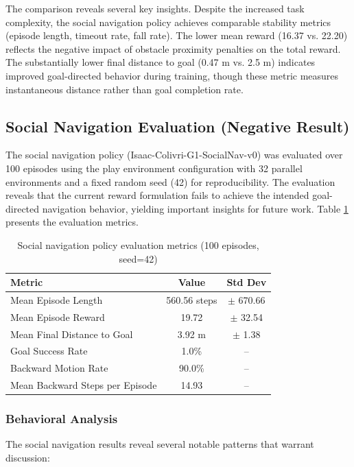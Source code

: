 \documentclass[12pt,a4paper]{article}
\begin{document}
The comparison reveals several key insights. Despite the increased task complexity, the social navigation policy achieves comparable stability metrics (episode length, timeout rate, fall rate). The lower mean reward (16.37 vs. 22.20) reflects the negative impact of obstacle proximity penalties on the total reward. The substantially lower final distance to goal (0.47 m vs. 2.5 m) indicates improved goal-directed behavior during training, though these metric measures instantaneous distance rather than goal completion rate.

\subsection{Social Navigation Evaluation (Negative Result)}

The social navigation policy (Isaac-Colivri-G1-SocialNav-v0) was evaluated over 100 episodes using the play environment configuration with 32 parallel environments and a fixed random seed (42) for reproducibility. The evaluation reveals that the current reward formulation fails to achieve the intended goal-directed navigation behavior, yielding important insights for future work. Table \ref{tab:social_nav_eval} presents the evaluation metrics.

\begin{table}[htbp]
\centering
\caption{Social navigation policy evaluation metrics (100 episodes, seed=42)}
\label{tab:social_nav_eval}
\begin{tabular}{lcc}
\toprule
\textbf{Metric} & \textbf{Value} & \textbf{Std Dev} \\
\midrule
Mean Episode Length & 560.56 steps & $\pm$ 670.66 \\
Mean Episode Reward & 19.72 & $\pm$ 32.54 \\
Mean Final Distance to Goal & 3.92 m & $\pm$ 1.38 \\
Goal Success Rate & 1.0\% & -- \\
Backward Motion Rate & 90.0\% & -- \\
Mean Backward Steps per Episode & 14.93 & -- \\
\bottomrule
\end{tabular}
\end{table}

\subsubsection{Behavioral Analysis}

The social navigation results reveal several notable patterns that warrant discussion:
\end{document}

